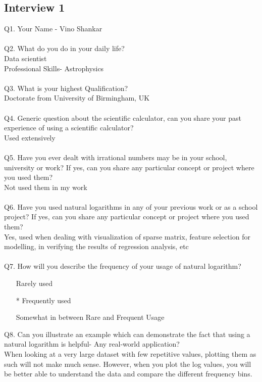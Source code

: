 \documentclass[12pt]{article}
\makeatletter
\newcommand*{\radiobutton}{%
  \@ifstar{\@radiobutton0}{\@radiobutton1}%
}
\newcommand*{\@radiobutton}[1]{%
  \begin{tikzpicture}
    \pgfmathsetlengthmacro\radius{height("X")/2}
    \draw[radius=\radius] circle;
    \ifcase#1 \fill[radius=.6*\radius] circle;\fi
  \end{tikzpicture}%
}
\makeatother
\begin{document}
\subsection{Interview 1}
Q1. Your Name -  Vino Shankar\\\\
Q2. What do you do in your daily life?\\ 
Data scientist\\
Professional Skills- Astrophysics\\\\
Q3. What is your highest Qualification?\\
Doctorate from University of Birmingham, UK \\\\
Q4. Generic question about the scientific calculator, can you share your past experience of using a scientific calculator?\\
Used extensively\\\\
Q5. Have you ever dealt with irrational numbers may be in your school, university or work? If yes, can you share any particular concept or project where you used them?\\
Not used them in my work\\\\
Q6. Have you used natural logarithms in any of your previous work or as a school project? If yes, can you share any particular concept or project where you used them?\\
Yes, used when dealing with visualization of sparse matrix, feature selection for modelling, in verifying the results of regression analysis, etc\\\\
Q7. How will you describe the frequency of your usage of natural logarithm?
\begin{itemize}
\item[\radiobutton] Rarely used
\item[\radiobutton*] Frequently used
\item[\radiobutton] Somewhat in between Rare and Frequent Usage
\end{itemize}
Q8. Can you illustrate an example which can demonstrate the fact that using a natural logarithm is helpful- Any real-world application?\\
When looking at a very large dataset with few repetitive values, plotting them as such will not make much sense. However, when you plot the log values, you will be better able to understand the data and compare the different frequency bins.\\\\
\end{document}
